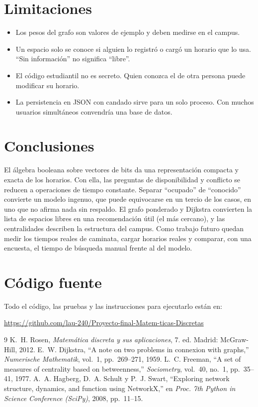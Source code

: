 \documentclass[conference,a4paper]{IEEEtran}
\newcommand{\repo}{\url{https://github.com/lau-240/Proyecto-final-Matem-ticas-Discretas}}
\begin{document}
\section{Limitaciones}
\begin{itemize}
  \item Los pesos del grafo son valores de ejemplo y deben medirse en el campus.
  \item Un espacio solo se conoce si alguien lo registró o cargó un horario que lo
  usa. ``Sin información'' no significa ``libre''.
  \item El código estudiantil no es secreto. Quien conozca el de otra persona puede
  modificar su horario.
  \item La persistencia en JSON con candado sirve para un solo proceso. Con muchos
  usuarios simultáneos convendría una base de datos.
\end{itemize}

\section{Conclusiones}
El álgebra booleana sobre vectores de bits da una representación compacta y exacta de
los horarios. Con ella, las preguntas de disponibilidad y conflicto se reducen a
operaciones de tiempo constante. Separar ``ocupado'' de ``conocido'' convierte un
modelo ingenuo, que puede equivocarse en un tercio de los casos, en uno que no afirma
nada sin respaldo. El grafo ponderado y Dijkstra convierten la lista de espacios
libres en una recomendación útil (el más cercano), y las centralidades describen la
estructura del campus. Como trabajo futuro quedan medir los tiempos reales de
caminata, cargar horarios reales y comparar, con una encuesta, el tiempo de búsqueda
manual frente al del modelo.

\section*{Código fuente}
Todo el código, las pruebas y las instrucciones para ejecutarlo están en:
\begin{center}\footnotesize\repo\end{center}

\begin{thebibliography}{9}
 K.~H. Rosen, \emph{Matemática discreta y sus aplicaciones}, 7.\textordfeminine{} ed.
Madrid: McGraw-Hill, 2012.
 E.~W. Dijkstra, ``A note on two problems in connexion with
graphs,'' \emph{Numerische Mathematik}, vol.~1, pp.~269--271, 1959.
 L.~C. Freeman, ``A set of measures of centrality based on
betweenness,'' \emph{Sociometry}, vol.~40, no.~1, pp.~35--41, 1977.
 A.~A. Hagberg, D.~A. Schult y P.~J. Swart, ``Exploring network
structure, dynamics, and function using NetworkX,'' en \emph{Proc. 7th Python in
Science Conference (SciPy)}, 2008, pp.~11--15.
\end{thebibliography}
\end{document}
